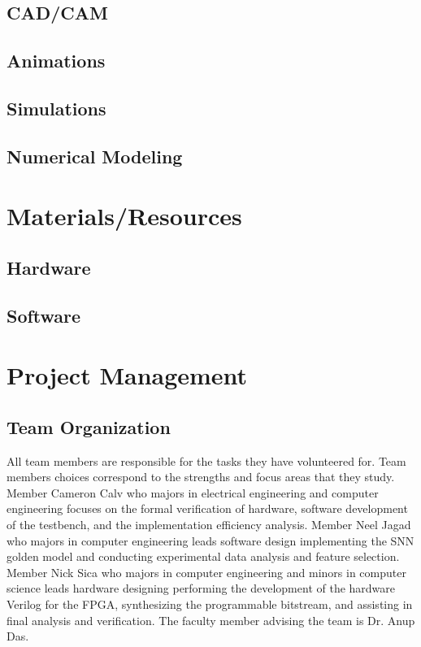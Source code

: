 \documentclass[12pt,titlepage]{article}
\begin{document}
\subsection{CAD/CAM}
\subsection{Animations}
\subsection{Simulations}
\subsection{Numerical Modeling}

\section{Materials/Resources}
\subsection{Hardware}
\subsection{Software}

\section{Project Management}
\subsection{Team Organization}
All team members are responsible for the tasks they have volunteered for. Team members choices correspond to the strengths and focus areas that they study.
Member Cameron Calv who majors in electrical engineering and computer engineering focuses on the formal verification of hardware, software development of
the testbench, and the implementation efficiency analysis. Member Neel Jagad who majors in computer engineering leads software design implementing the SNN
golden model and conducting experimental data analysis and feature selection. Member Nick Sica who majors in computer engineering and minors in computer
science leads hardware designing performing the development of the hardware Verilog for the FPGA, synthesizing the programmable bitstream, and assisting in
final analysis and verification. The faculty member advising the team is Dr. Anup Das. 
\end{document}
